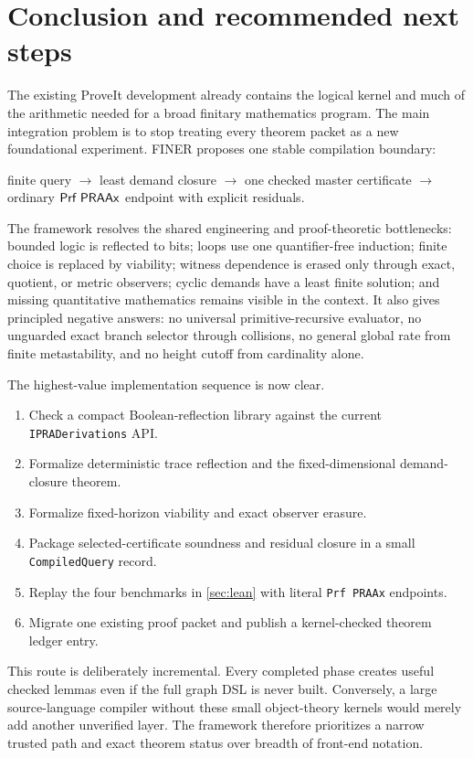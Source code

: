 \section{Conclusion and recommended next steps}
\label{sec:conclusion}

The existing ProveIt development already contains the logical kernel and much of the arithmetic needed for a broad finitary mathematics program.  The main integration problem is to stop treating every theorem packet as a new foundational experiment.  FINER proposes one stable compilation boundary:
\begin{center}
finite query \(\longrightarrow\) least demand closure \(\longrightarrow\) one checked master certificate \(\longrightarrow\) ordinary \(\mathsf{Prf}\;\mathsf{PRAAx}\) endpoint with explicit residuals.
\end{center}

The framework resolves the shared engineering and proof-theoretic bottlenecks: bounded logic is reflected to bits; loops use one quantifier-free induction; finite choice is replaced by viability; witness dependence is erased only through exact, quotient, or metric observers; cyclic demands have a least finite solution; and missing quantitative mathematics remains visible in the context.  It also gives principled negative answers: no universal primitive-recursive evaluator, no unguarded exact branch selector through collisions, no general global rate from finite metastability, and no height cutoff from cardinality alone.

The highest-value implementation sequence is now clear.

\begin{enumerate}[label=\textbf{Step \arabic*.},leftmargin=4.2em]
\item Check a compact Boolean-reflection library against the current \texttt{IPRADerivations} API.
\item Formalize deterministic trace reflection and the fixed-dimensional demand-closure theorem.
\item Formalize fixed-horizon viability and exact observer erasure.
\item Package selected-certificate soundness and residual closure in a small \texttt{CompiledQuery} record.
\item Replay the four benchmarks in \cref{sec:lean} with literal \texttt{Prf PRAAx} endpoints.
\item Migrate one existing proof packet and publish a kernel-checked theorem ledger entry.
\end{enumerate}

This route is deliberately incremental.  Every completed phase creates useful checked lemmas even if the full graph DSL is never built.  Conversely, a large source-language compiler without these small object-theory kernels would merely add another unverified layer.  The framework therefore prioritizes a narrow trusted path and exact theorem status over breadth of front-end notation.
